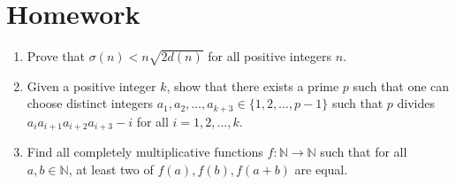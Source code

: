 \documentclass{article}
\begin{document}
\section{Homework}
\begin{enumerate}
  \item Prove that $\sigma(n)<n\sqrt{2d(n)}$ for all positive integers $n$.
  \item Given a positive integer $k$, show that there exists a prime $p$ such
    that one can choose distinct integers
    $a_1,a_2,\ldots,a_{k+3}\in\{1,2,\ldots,p-1\}$ such that $p$ divides
    $a_i a_{i+1}a_{i+2}a_{i+3}-i$ for all $i=1,2,\ldots,k$.
  \item Find all completely multiplicative functions $f:\mathbb N\to\mathbb N$
    such that for all $a,b\in\mathbb N$, at least two of $f(a),f(b),f(a+b)$ are
    equal.
\end{enumerate}
\end{document}
